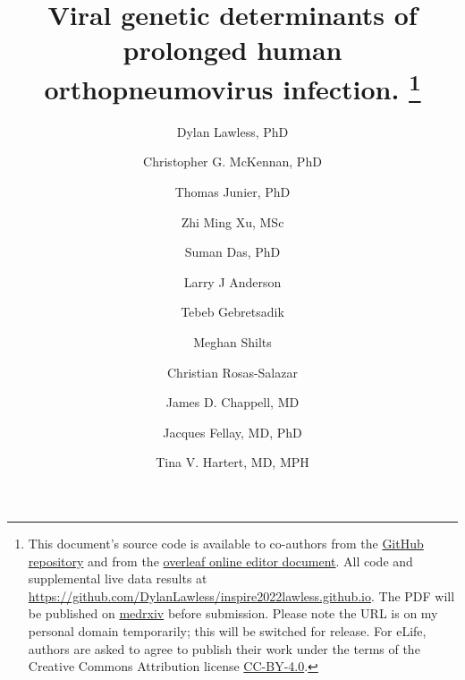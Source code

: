 \documentclass{article} %
\begin{document}
\date{} %
\title{\Large \bf Viral genetic determinants of prolonged human orthopneumovirus infection.
\footnote{This document's source code is available to co-authors from the 
\href{https://github.com/DylanLawless/inspire2022lawless.github.io}{GitHub repository} 
and from the 
\href{https://www.overleaf.com/project/61718a4e077acc3d20ee68f1}{overleaf online editor document}. 
All code and supplemental live data results at \href{https://github.com/DylanLawless/inspire2022lawless.github.io}{https://github.com/DylanLawless/inspire2022lawless.github.io}. 
The PDF will be published on  \href{https://www.medrxiv.org}{medrxiv} 
before submission.
Please note the URL is on my personal domain temporarily; this will be switched for release.
For eLife, authors are asked to agree to publish their work under the terms of the Creative Commons Attribution license
\href{https://creativecommons.org/licenses/by/4.0/}{CC-BY-4.0}.
}
}

\author[epfl]{\rm Dylan Lawless, PhD}
\author[penn]{\rm Christopher G. McKennan, PhD}
\author[sib]{\rm Thomas Junier, PhD}
\author[epfl]{\rm Zhi Ming Xu, MSc}
\author[**]{\rm Suman Das, PhD}
\author[emoryPed]{\rm Larry J Anderson}
\author[bioVan]{\rm  Tebeb Gebretsadik}
\author[**]{\rm Meghan Shilts}
\author[**]{\rm Christian Rosas-Salazar}
\author[pedVan]{\rm James D. Chappell, MD}
\author[epfl]{\rm Jacques Fellay, MD, PhD }
\author[pedVan,medVan]{\rm Tina V. Hartert, MD, MPH}

\maketitle
\end{document}
